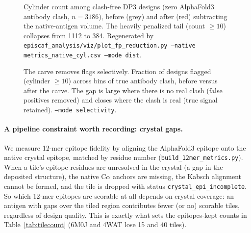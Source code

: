 \begin{figure}[h]\centering
{}
\caption{Cylinder count among clash-free DP3 designs (zero AlphaFold3 antibody clash,
$n=\num{3186}$), before (grey) and after (red) subtracting the native-antigen volume. The
heavily penalized tail (count $\ge 10$) collapses from \num{1112} to \num{384}. Regenerated
by \texttt{episcaf\_analysis/viz/plot\_fp\_reduction.py --native metrics\_native\_cyl.csv
--mode dist}.}
\label{fig:fp}
\end{figure}

\begin{figure}[h]\centering
{}
\caption{The carve removes flags selectively. Fraction of designs flagged (cylinder
$\ge 10$) across bins of true antibody clash, before versus after the carve. The gap is
large where there is no real clash (false positives removed) and closes where the clash is
real (true signal retained). \texttt{--mode selectivity}.}
\label{fig:fpsel}
\end{figure}

\paragraph{A pipeline constraint worth recording: crystal gaps.}
We measure 12-mer epitope fidelity by aligning the AlphaFold3 epitope onto the native crystal
epitope, matched by residue number (\texttt{build\_12mer\_metrics.py}). When a tile's epitope
residues are unresolved in the crystal (a gap in the deposited structure), the native
C$\alpha$ anchors are missing, the Kabsch alignment cannot be formed, and the tile is dropped
with status \texttt{crystal\_epi\_incomplete}. So which 12-mer epitopes are scorable at all
depends on crystal coverage: an antigen with gaps over the tiled region contributes fewer (or
no) scorable tiles, regardless of design quality. This is exactly what sets the
epitopes-kept counts in Table~\ref{tab:tilecount} (6M0J and 4WAT lose 15 and 40 tiles).

